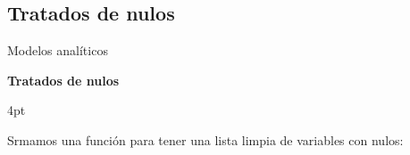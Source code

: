 \documentclass[pdf]{beamer}
\def\\{}%
\def\vspace{}%
\begin{document}
{%

    \subsection{Tratados de nulos}

\begin{frame}{Modelos analíticos}

    \begin{Large}
        \textbf{Tratados de nulos}
    \end{Large}
    \vspace{4pt}

    Srmamos una función para tener una lista limpia de variables con nulos:


\end{frame}}
\end{document}
